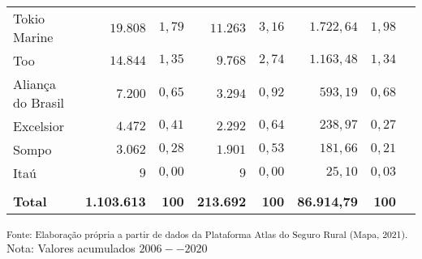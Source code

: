 \begin{tabularx}{\textwidth}{lRRRRRRR}
    Tokio Marine      &  $19.808$       &  $1,79  $                 &  $11.263$                    &  $3,16  $             &  $1.722,64$        &  $1,98  $               \\
    Too               &  $14.844$       &  $1,35  $                 &  $9.768$                     &  $2,74  $             &  $1.163,48$        &  $1,34  $               \\
    Aliança do Brasil &  $7.200$        &  $0,65  $                 &  $3.294$                     &  $0,92  $             &  $593,19$          &  $0,68  $               \\
    Excelsior         &  $4.472$        &  $0,41  $                 &  $2.292$                     &  $0,64  $             &  $238,97$          &  $0,27  $               \\
    Sompo             &  $3.062$        &  $0,28  $                 &  $1.901$                     &  $0,53  $             &  $181,66$          &  $0,21  $               \\
    Itaú              &  $9$            &  $0,00  $                 &  $9$                         &  $0,00  $             &  $25,10$           &  $0,03  $               \\
    \hline \\[-1.9ex]
    \textbf{Total}    & \textbf{1.103.613} & \textbf{100  }         & \textbf{213.692}             & \textbf{100  }        & \textbf{86.914,79} & \textbf{100  }\\
	\hline 
\end{tabularx}
\small \textsuperscript{Fonte: Elaboração própria a partir de dados da Plataforma Atlas do Seguro Rural (Mapa, 2021).}\\
\footnotesize{Nota: Valores acumulados $2006 -- 2020$}\\